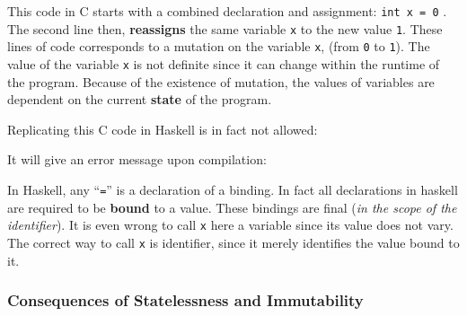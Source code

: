 This code in C starts with a combined declaration and assignment:
\texttt{int\ x\ =\ 0} . The second line then, \textbf{reassigns} the
same variable \texttt{x} to the new value \texttt{1}. These lines of
code corresponds to a mutation on the variable \texttt{x}, (from
\texttt{0} to \texttt{1}). The value of the variable \texttt{x} is not
definite since it can change within the runtime of the program. Because
of the existence of mutation, the values of variables are dependent on
the current \textbf{state} of the program.

Replicating this C code in Haskell is in fact not allowed:

\begin{Shaded}
\begin{Highlighting}[]
\OtherTok{=} 
\OtherTok{=} 
\end{Highlighting}
\end{Shaded}

It will give an error message upon compilation:

\begin{Shaded}
\begin{Highlighting}[]
\OperatorTok{:}\OperatorTok{:}\OperatorTok{:} \OperatorTok{:}
  \OperatorTok{:}\OperatorTok{:}\OperatorTok{:}
\OperatorTok{:}\OperatorTok{:}
\end{Highlighting}
\end{Shaded}

In Haskell, any ``\texttt{=}'' is a declaration of a binding. In fact
all declarations in haskell are required to be \textbf{bound }to a
value. These bindings are final (\emph{in the scope of the identifier}).
It is even wrong to call \texttt{x} here a variable since its value does
not vary. The correct way to call \texttt{x} is identifier, since it
merely identifies the value bound to it.

\subsubsection{Consequences of Statelessness and
Immutability}\label{functional-programming-paradigm.md__consequences-of-statelessness-and-immutability}

